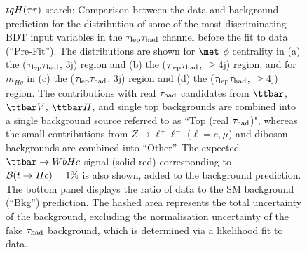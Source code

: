 \begin{figure}[t]
\begin{center}
\caption{$tqH(\tau\tau)$ search: Comparison between the data and background prediction for the distribution of some of the most
discriminating BDT input variables in the $\tau_{\mathrm{lep}} \tau_{\mathrm{had}}$ channel before the fit to data (``Pre-Fit''). The distributions are shown for
$\met$ $\phi$ centrality in (a) the ($\tau_{\mathrm{lep}} \tau_{\mathrm{had}}$, 3j) region and (b) the ($\tau_{\mathrm{lep}} \tau_{\mathrm{had}}$, $\geq$4j) region, and for
$m_{Hq}$ in (c) the ($\tau_{\mathrm{lep}} \tau_{\mathrm{had}}$, 3j)  region and (d) the ($\tau_{\mathrm{lep}} \tau_{\mathrm{had}}$, $\geq$4j) region.
The contributions with real $\tau_{\mathrm{had}}$ candidates from $\ttbar$,  $\ttbar V$, $\ttbar H$, and single top backgrounds are combined into
a single background source referred to as ``Top (real $\tau_{\mathrm{had}}$)", whereas the small contributions from 
$Z\to \ell^+\ell^-$ ($\ell = e, \mu$) and diboson backgrounds are combined into ``Other''. 
The expected $\Hc$ signal (solid red) corresponding to $\mathcal{B}(t\to Hc)=1\%$ is also shown,
added to the background prediction.
The bottom panel displays the ratio of data to the SM background (``Bkg'') prediction.
The hashed area represents the total uncertainty of the background, excluding the normalisation uncertainty of the fake $\tau_{\mathrm{had}}$ background, 
which is determined via a likelihood fit to data.}
\label{fig:BDT_inputs_lephad_3}
\end{center}
\end{figure}


